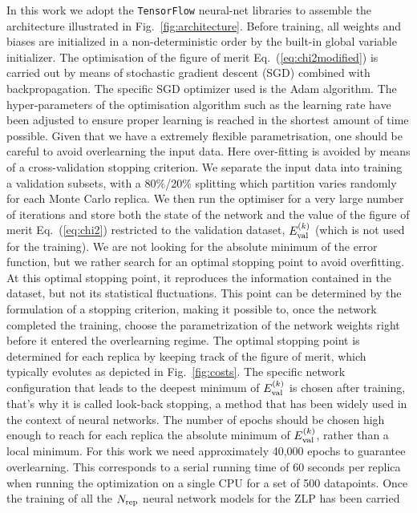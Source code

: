 In this work we adopt the {\tt TensorFlow} neural-net libraries to assemble
the architecture illustrated in Fig.~\ref{fig:architecture}.
%
Before training, all weights and biases are initialized in a non-deterministic order
by the built-in global variable initializer. 
%
The optimisation of the figure of merit Eq.~(\ref{eq:chi2modified}) is carried
out by means of stochastic gradient descent (SGD) combined with backpropagation. The
specific SGD optimizer used is the Adam algorithm.
%
The hyper-parameters of the optimisation algorithm such as the learning rate
have been adjusted to ensure proper learning is reached in the shortest amount
of time possible.
%
Given that we have a extremely flexible parametrisation, one should be careful
to avoid overlearning the input data.
%
Here over-fitting is avoided by means of a cross-validation stopping criterion.
%
We separate the input data into training a validation subsets, with a 80\%/20\% splitting
which partition varies randomly for each Monte Carlo replica.
%
We then run the optimiser for a very large number of iterations and store both
the state of the network and the value
of the figure of merit Eq.~(\ref{eq:chi2}) restricted to the validation
dataset, $E^{(k)}_{\rm val}$ (which is not used for the training).
%
We are not looking for the absolute minimum of the error function, 
but we rather search for an optimal stopping point to avoid overfitting. 
%
At this optimal stopping point, it reproduces the information contained in the dataset, 
but not its statistical fluctuations.
%
This point can be determined by the formulation of a stopping criterion, 
making it possible to, once the network completed the training, 
choose the parametrization of the network weights right before it 
entered the overlearning regime. 
%
The optimal stopping point is determined  for each replica
by keeping track of the figure of merit, which typically evolutes
as depicted in Fig.~\ref{fig:costs}. 
%
The specific network configuration that leads to the deepest minimum of $E^{(k)}_{\rm val}$
is chosen after training, that's why it is called look-back stopping, 
a method that has been widely used in the context
of neural networks.
%
The number of epochs should be chosen high enough to reach for each replica 
the absolute minimum of $E^{(k)}_{\rm val}$, 
rather than a local minimum.
For this work we need approximately 40,000 epochs to guarantee overlearning.
%
This corresponds to a serial running time of 60 seconds per replica when running the optimization on a 
single CPU for a set of 500 datapoints.
%
Once the training of all the $N_{\rm rep}$ neural network models for the ZLP has been carried
